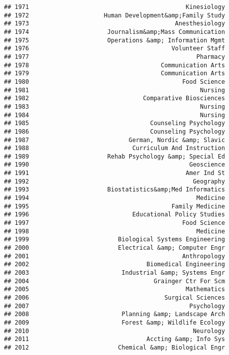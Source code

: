 \documentclass[
]{article}
\begin{document}
\begin{verbatim}
## 1971                                            Kinesiology
## 1972                     Human Development&amp;Family Study
## 1973                                         Anesthesiology
## 1974                      Journalism&amp;Mass Communication
## 1975                      Operations &amp; Information Mgmt
## 1976                                        Volunteer Staff
## 1977                                               Pharmacy
## 1978                                     Communication Arts
## 1979                                     Communication Arts
## 1980                                           Food Science
## 1981                                                Nursing
## 1982                                Comparative Biosciences
## 1983                                                Nursing
## 1984                                                Nursing
## 1985                                  Counseling Psychology
## 1986                                  Counseling Psychology
## 1987                            German, Nordic &amp; Slavic
## 1988                             Curriculum And Instruction
## 1989                      Rehab Psychology &amp; Special Ed
## 1990                                             Geoscience
## 1991                                            Amer Ind St
## 1992                                              Geography
## 1993                      Biostatistics&amp;Med Informatics
## 1994                                               Medicine
## 1995                                        Family Medicine
## 1996                             Educational Policy Studies
## 1997                                           Food Science
## 1998                                               Medicine
## 1999                         Biological Systems Engineering
## 2000                         Electrical &amp; Computer Engr
## 2001                                           Anthropology
## 2002                                 Biomedical Engineering
## 2003                          Industrial &amp; Systems Engr
## 2004                                   Grainger Ctr For Scm
## 2005                                            Mathematics
## 2006                                      Surgical Sciences
## 2007                                             Psychology
## 2008                          Planning &amp; Landscape Arch
## 2009                          Forest &amp; Wildlife Ecology
## 2010                                              Neurology
## 2011                                 Accting &amp; Info Sys
## 2012                         Chemical &amp; Biological Engr

\end{verbatim}
\end{document}
